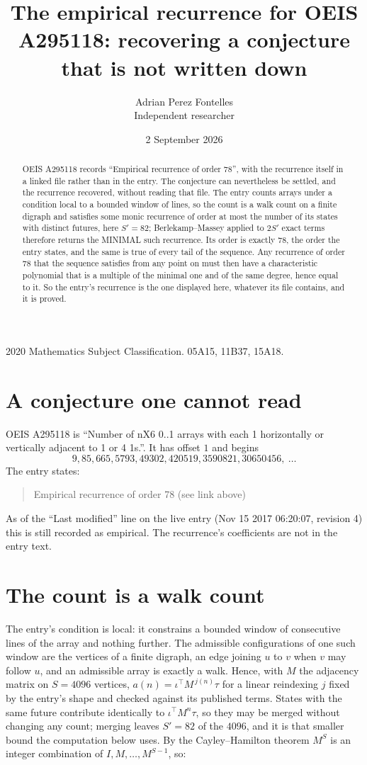 \documentclass[11pt,a4paper]{article}
\title{The empirical recurrence for OEIS A295118: recovering a conjecture that is not written down}
\author{Adrian Perez Fontelles\\ \small Independent researcher}
\date{2 September 2026}
\theoremstyle{plain}
\theoremstyle{definition}
\begin{document}
\maketitle

\begin{abstract}
OEIS A295118 records ``Empirical recurrence of order $78$'', with the recurrence itself in a
linked file rather than in the entry. The conjecture can nevertheless be settled, and the
recurrence recovered, without reading that file. The entry counts arrays under a condition
local to a bounded window of lines, so the count is a walk count on a finite digraph and
satisfies some monic recurrence of order at most the number of its states with distinct
futures, here $S'=82$; Berlekamp--Massey applied to $2S'$ exact
terms therefore returns the MINIMAL such recurrence. Its order is exactly $78$, the order
the entry states, and the same is true of every tail of the sequence. Any recurrence of order
$78$ that the sequence satisfies from any point on must then have a characteristic
polynomial that is a multiple of the minimal one and of the same degree, hence equal to it. So
the entry's recurrence is the one displayed here, whatever its file contains, and it is
proved.
\end{abstract}

\noindent\small 2020 Mathematics Subject Classification. 05A15, 11B37, 15A18.\normalsize

\section{A conjecture one cannot read}

OEIS A295118 is ``Number of nX6 0..1 arrays with each 1 horizontally or vertically adjacent to 1 or 4 1s.''. It has offset $1$ and begins
\[
9, 85, 665, 5793, 49302, 420519, 3590821, 30650456,\ \dots
\]
The entry states:
\begin{quote}
Empirical recurrence of order 78 (see link above)
\end{quote}
As of the ``Last modified'' line on the live entry (Nov 15 2017 06:20:07, revision 4) this is still
recorded as empirical. The recurrence's coefficients are not in the entry text.

\section{The count is a walk count}

The entry's condition is local: it constrains a bounded window of consecutive lines of the
array and nothing further. The admissible configurations of one such window are the vertices
of a finite digraph, an edge joining $u$ to $v$ when $v$ may follow $u$, and an admissible
array is exactly a walk. Hence, with $M$ the adjacency matrix on $S=4096$ vertices,
$a(n)=\iota^{\!\top}M^{\,j(n)}\tau$ for a linear reindexing $j$ fixed by the entry's shape
and checked against its published terms. States with the same future contribute identically to $\iota^{\!\top}M^n\tau$, so they may be merged without changing any count; merging leaves $S'=82$ of the $4096$, and it is that smaller bound the computation below uses. By the Cayley--Hamilton theorem $M^{S}$ is an
integer combination of $I,M,\dots,M^{S-1}$, so:
\end{document}

